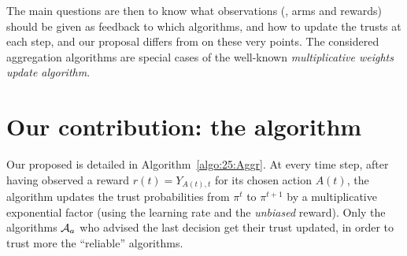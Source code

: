 The main questions are then to know what observations (\ie, arms and rewards) should be given as feedback to which algorithms,
and how to update the trusts at each step, and our proposal \Aggr{} differs from \ExpQ{} on these very points.
%
The considered aggregation algorithms are special cases of the well-known \emph{multiplicative weights update algorithm}.



\section{Our contribution: the \Aggr{} algorithm}\label{sub:25:Aggr}


Our proposed \Aggr{} is detailed in Algorithm~\ref{algo:25:Aggr}.
%
At every time step, after having observed a reward $r(t)=Y_{A(t),t}$ for its chosen action $A(t)$,
the algorithm updates the trust probabilities from $\pi^t$ to $\pi^{t+1}$ by
a multiplicative exponential factor (using the learning rate and the \emph{unbiased} reward).
%
Only the algorithms $\mathcal{A}_a$ who advised the last decision get their trust updated, in order to trust more the ``reliable'' algorithms.

